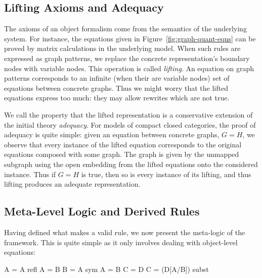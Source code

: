 \documentclass[runningheads]{llncs}
\begin{document}
\subsection{Lifting Axioms and Adequacy} 

The axioms of an object formalism come from the semantics of the
underlying system. For instance, the equations given in
Figure~\ref{fig:graph-quant-eqns} can be proved by matrix
calculations in the underlying model. When such rules are expressed
as graph patterns, we replace the concrete representation's boundary
nodes with variable nodes. This operation is called \emph{lifting}. An
equation on graph patterns corresponds to an infinite (when their are
variable nodes) set of equations between concrete graphs. Thus we
might worry that the lifted equations express too much: they may allow
rewrites which are not true.

We call the property that the lifted representation is a conservative
extension of the initial theory \emph{adequacy}. For models of compact
closed categories, the proof of adequacy is quite simple: given an
equation between concrete graphs, $G = H$, we observe that every
instance of the lifted equation corresponds to the original equations
composed with some graph. The graph is given by the unmapped subgraph
using the open embedding from the lifted equations onto the considered
instance. Thus if $G = H$ is true, then so is every instance of its
lifting, and thus lifting produces an adequate representation.

\subsection{Meta-Level Logic and Derived Rules}

Having defined what makes a valid rule, we now present the meta-logic
of the framework. This is quite simple as it only involves dealing
with object-level equations:

\begin{center}
\prooftree
\justifies
\Gamma \vdash A = A
\using\mbox{refl}
\endprooftree 
\quad\quad
\prooftree
\Gamma \vdash A = B
\justifies
\Gamma \vdash B = A
\using\mbox{sym}
\endprooftree
\quad\quad
\prooftree
\Gamma \vdash A = B \quad\quad
\Gamma \vdash C = D
\justifies
\Gamma \vdash C = (D[A/B])
\using\mbox{subst}
\endprooftree
\end{center}
\end{document}
